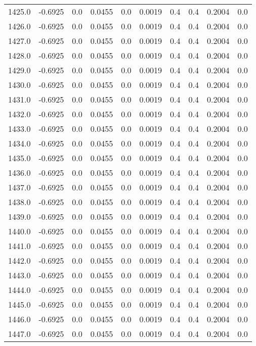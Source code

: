 \begin{longtable}{lrrrrrrrrr}
1425.0 & -0.6925 & 0.0 & 0.0455 & 0.0 & 0.0019 & 0.4 & 0.4 & 0.2004 & 0.0 \\
1426.0 & -0.6925 & 0.0 & 0.0455 & 0.0 & 0.0019 & 0.4 & 0.4 & 0.2004 & 0.0 \\
1427.0 & -0.6925 & 0.0 & 0.0455 & 0.0 & 0.0019 & 0.4 & 0.4 & 0.2004 & 0.0 \\
1428.0 & -0.6925 & 0.0 & 0.0455 & 0.0 & 0.0019 & 0.4 & 0.4 & 0.2004 & 0.0 \\
1429.0 & -0.6925 & 0.0 & 0.0455 & 0.0 & 0.0019 & 0.4 & 0.4 & 0.2004 & 0.0 \\
1430.0 & -0.6925 & 0.0 & 0.0455 & 0.0 & 0.0019 & 0.4 & 0.4 & 0.2004 & 0.0 \\
1431.0 & -0.6925 & 0.0 & 0.0455 & 0.0 & 0.0019 & 0.4 & 0.4 & 0.2004 & 0.0 \\
1432.0 & -0.6925 & 0.0 & 0.0455 & 0.0 & 0.0019 & 0.4 & 0.4 & 0.2004 & 0.0 \\
1433.0 & -0.6925 & 0.0 & 0.0455 & 0.0 & 0.0019 & 0.4 & 0.4 & 0.2004 & 0.0 \\
1434.0 & -0.6925 & 0.0 & 0.0455 & 0.0 & 0.0019 & 0.4 & 0.4 & 0.2004 & 0.0 \\
1435.0 & -0.6925 & 0.0 & 0.0455 & 0.0 & 0.0019 & 0.4 & 0.4 & 0.2004 & 0.0 \\
1436.0 & -0.6925 & 0.0 & 0.0455 & 0.0 & 0.0019 & 0.4 & 0.4 & 0.2004 & 0.0 \\
1437.0 & -0.6925 & 0.0 & 0.0455 & 0.0 & 0.0019 & 0.4 & 0.4 & 0.2004 & 0.0 \\
1438.0 & -0.6925 & 0.0 & 0.0455 & 0.0 & 0.0019 & 0.4 & 0.4 & 0.2004 & 0.0 \\
1439.0 & -0.6925 & 0.0 & 0.0455 & 0.0 & 0.0019 & 0.4 & 0.4 & 0.2004 & 0.0 \\
1440.0 & -0.6925 & 0.0 & 0.0455 & 0.0 & 0.0019 & 0.4 & 0.4 & 0.2004 & 0.0 \\
1441.0 & -0.6925 & 0.0 & 0.0455 & 0.0 & 0.0019 & 0.4 & 0.4 & 0.2004 & 0.0 \\
1442.0 & -0.6925 & 0.0 & 0.0455 & 0.0 & 0.0019 & 0.4 & 0.4 & 0.2004 & 0.0 \\
1443.0 & -0.6925 & 0.0 & 0.0455 & 0.0 & 0.0019 & 0.4 & 0.4 & 0.2004 & 0.0 \\
1444.0 & -0.6925 & 0.0 & 0.0455 & 0.0 & 0.0019 & 0.4 & 0.4 & 0.2004 & 0.0 \\
1445.0 & -0.6925 & 0.0 & 0.0455 & 0.0 & 0.0019 & 0.4 & 0.4 & 0.2004 & 0.0 \\
1446.0 & -0.6925 & 0.0 & 0.0455 & 0.0 & 0.0019 & 0.4 & 0.4 & 0.2004 & 0.0 \\
1447.0 & -0.6925 & 0.0 & 0.0455 & 0.0 & 0.0019 & 0.4 & 0.4 & 0.2004 & 0.0 \\

\end{longtable}
